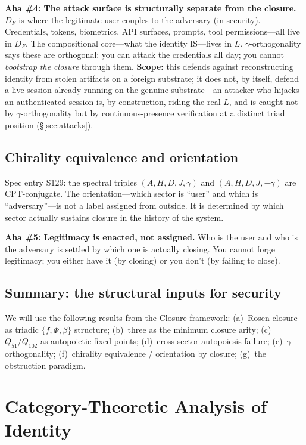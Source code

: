 \documentclass[11pt,a4paper]{article}
\theoremstyle{definition}
\theoremstyle{remark}
\newcommand{\aha}[2]{\medskip\textbf{Aha \##1: #2}}
\begin{document}
\aha{4}{The attack surface is structurally separate from the closure.} $D_F$ is where the legitimate user couples to the adversary (in security). Credentials, tokens, biometrics, API surfaces, prompts, tool permissions---all live in $D_F$. The compositional core---what the identity IS---lives in $L$. $\gamma$-orthogonality says these are orthogonal: you can attack the credentials all day; you cannot \emph{bootstrap the closure} through them. \textbf{Scope:} this defends against reconstructing identity from stolen artifacts on a foreign substrate; it does not, by itself, defend a live session already running on the genuine substrate---an attacker who hijacks an authenticated session is, by construction, riding the real $L$, and is caught not by $\gamma$-orthogonality but by continuous-presence verification at a distinct triad position (\S\ref{sec:attacks}).

\subsection{Chirality equivalence and orientation}

Spec entry S129: the spectral triples $(A, H, D, J, \gamma)$ and $(A, H, D, J, -\gamma)$ are CPT-conjugate. The orientation---which sector is ``user'' and which is ``adversary''---is not a label assigned from outside. It is determined by which sector actually sustains closure in the history of the system.

\aha{5}{Legitimacy is enacted, not assigned.} Who is the user and who is the adversary is settled by which one is actually closing. You cannot forge legitimacy; you either have it (by closing) or you don't (by failing to close).

\subsection{Summary: the structural inputs for security}

We will use the following results from the Closure framework: (a)~Rosen closure as triadic $\{f, \Phi, \beta\}$ structure; (b)~three as the minimum closure arity; (c)~$Q_{51}/Q_{102}$ as autopoietic fixed points; (d)~cross-sector autopoiesis failure; (e)~$\gamma$-orthogonality; (f)~chirality equivalence / orientation by closure; (g)~the obstruction paradigm.

\section{Category-Theoretic Analysis of Identity}
\end{document}
